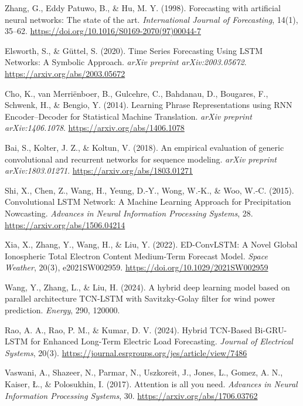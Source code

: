 \documentclass{article}
\begin{document}
% 
\begin{thebibliography}{9}

Zhang, G., Eddy Patuwo, B., \& Hu, M. Y. (1998).
Forecasting with artificial neural networks: The state of the art.
\textit{International Journal of Forecasting}, 14(1), 35–62.
\url{https://doi.org/10.1016/S0169-2070(97)00044-7}

Elsworth, S., \& Güttel, S. (2020).
Time Series Forecasting Using LSTM Networks: A Symbolic Approach.
\textit{arXiv preprint arXiv:2003.05672}.
\url{https://arxiv.org/abs/2003.05672}

Cho, K., van Merriënboer, B., Gulcehre, C., Bahdanau, D., Bougares, F., Schwenk, H., \& Bengio, Y. (2014).  
Learning Phrase Representations using RNN Encoder–Decoder for Statistical Machine Translation.  
\textit{arXiv preprint arXiv:1406.1078}.  
\url{https://arxiv.org/abs/1406.1078} 

Bai, S., Kolter, J. Z., \& Koltun, V. (2018).
An empirical evaluation of generic convolutional and recurrent networks for sequence modeling.
\textit{arXiv preprint arXiv:1803.01271}.
\url{https://arxiv.org/abs/1803.01271}


Shi, X., Chen, Z., Wang, H., Yeung, D.-Y., Wong, W.-K., \& Woo, W.-C. (2015).
Convolutional LSTM Network: A Machine Learning Approach for Precipitation Nowcasting.
\textit{Advances in Neural Information Processing Systems}, 28.
\url{https://arxiv.org/abs/1506.04214}

Xia, X., Zhang, Y., Wang, H., \& Liu, Y. (2022).
ED-ConvLSTM: A Novel Global Ionospheric Total Electron Content Medium-Term Forecast Model.
\textit{Space Weather}, 20(3), e2021SW002959.
\url{https://doi.org/10.1029/2021SW002959}

Wang, Y., Zhang, L., \& Liu, H. (2024).
A hybrid deep learning model based on parallel architecture TCN-LSTM with Savitzky-Golay filter for wind power prediction.
\textit{Energy}, 290, 120000.


Rao, A. A., Rao, P. M., \& Kumar, D. V. (2024).
Hybrid TCN-Based Bi-GRU-LSTM for Enhanced Long-Term Electric Load Forecasting.
\textit{Journal of Electrical Systems}, 20(3).
\url{https://journal.esrgroups.org/jes/article/view/7486}

Vaswani, A., Shazeer, N., Parmar, N., Uszkoreit, J., Jones, L., Gomez, A. N., Kaiser, Ł., \& Polosukhin, I. (2017).
Attention is all you need.
\textit{Advances in Neural Information Processing Systems}, 30.
\url{https://arxiv.org/abs/1706.03762}


\end{thebibliography}
\end{document}
